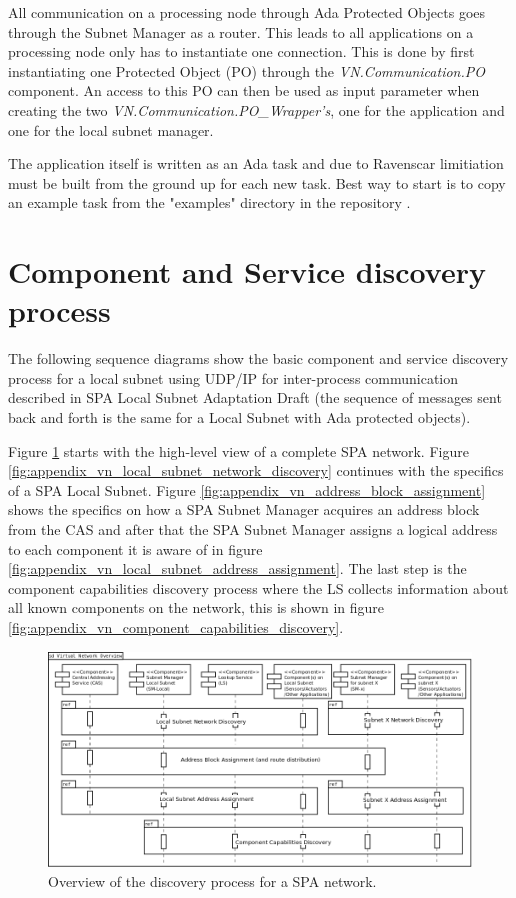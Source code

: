 All communication on a processing node through Ada Protected Objects goes
through the Subnet Manager as a router. This leads to all applications on
a processing node only has to instantiate one connection. This is done by first
instantiating one Protected Object (PO) through the \newline \emph{VN.Communication.PO}
component. An access to this PO can then be used as input parameter when
creating the two \emph{VN.Communication.PO\_Wrapper's}, one for the application
and one for the local subnet manager.

The application itself is written as an Ada task and due to Ravenscar
limitiation must be built from the ground up for each new task. Best way to
start is to copy an example task from the "examples" directory in the
repository \cite{web:github-vn-lib}.

\section{Component and Service discovery process}\label{sec:discovery_process}
The following sequence diagrams show the basic component and service discovery
process for a local subnet using UDP/IP for inter-process communication
described in SPA Local Subnet Adaptation Draft \cite{spa:local-subnet} (the
sequence of messages sent back and forth is the same for a Local Subnet with
Ada protected objects).

Figure
\ref{fig:appendix_vn_discovery_overview} starts with the high-level view of a
complete SPA network. Figure
\ref{fig:appendix_vn_local_subnet_network_discovery} continues with the
specifics of a SPA Local Subnet. Figure
\ref{fig:appendix_vn_address_block_assignment} shows the specifics on how a SPA
Subnet Manager acquires an address block from the CAS and after that the SPA
Subnet Manager assigns a logical address to each component it is aware of in
figure \ref{fig:appendix_vn_local_subnet_address_assignment}. The last step is the
component capabilities discovery process where the LS collects
information about all known components on the network, this is shown in figure
\ref{fig:appendix_vn_component_capabilities_discovery}.

\begin{figure}[h]
    \centering
    \includegraphics[width=\textwidth]{figures/vn_discovery_overview}
    \caption{Overview of the discovery process for a SPA network.}
    \label{fig:appendix_vn_discovery_overview}
\end{figure}

